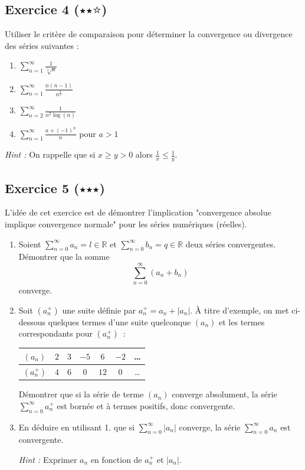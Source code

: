 \documentclass{article}
\begin{document}
\subsection*{Exercice 4 ($\medblackstar \medblackstar \medwhitestar$)}
Utiliser le critère de comparaison pour déterminer la convergence ou divergence des séries suivantes :
\begin{enumerate}
    \item $\displaystyle\sum_{n = 1}^{\infty} \frac{1}{\sqrt[3]{n}}$
    \item $\displaystyle\sum_{n = 1}^{\infty} \frac{n(n-1)}{n^{\frac{8}{3}}}$
    \item $\displaystyle\sum_{n = 2}^{\infty} \frac{1}{n^2 \log(n)}$
    \item $\displaystyle\sum_{n = 1}^{\infty} \frac{a + (-1)^n}{n}$ pour $a > 1$
\end{enumerate}

\textit{Hint :} On rappelle que si $x \geq y > 0$ alors $\frac{1}{x} \leq \frac{1}{y}$.

\subsection*{Exercice 5 ($\medblackstar \medblackstar \medblackstar$)}
L'idée de cet exercice est de démontrer l'implication "convergence absolue implique convergence normale" pour les séries numériques (réelles).
\begin{enumerate}
    \item Soient $\displaystyle\sum_{n = 0}^{\infty} a_n = l \in \mathbb{R}$ et $\displaystyle\sum_{n = 0}^{\infty} b_n = q \in \mathbb{R}$ deux séries convergentes. Démontrer que la somme
    \[
    \sum_{n = 0}^{\infty} (a_n + b_n)
    \]
    converge.
    \item Soit $(a_n^+)$ une suite définie par $a_n^+ = a_n + |a_n|$. À titre d'exemple, on met ci-dessous quelques termes d'une suite quelconque $(a_n)$ et les termes correspondants pour $(a_n^+)$~:
    \begin{table}[h]
        \centering
        \begin{tabular}{|c|cccccc|}
        \hline
        $(a_n)$   & $2$ & $3$ & $-5$ & $6$  & $-2$ & \ldots \\
        \hline
        $(a_n^+)$ & $4$ & $6$ & $0$  & $12$ & $0$  & \ldots \\
        \hline
        \end{tabular}
        \label{tab:exo4}
    \end{table}
    
    Démontrer que si la série de terme $(a_n)$ converge absolument, la série $\displaystyle\sum_{n = 0}^{\infty} a_n^+$ est bornée et à termes positifs, donc convergente.
    \item En déduire en utilisant 1. que si $\displaystyle \sum_{n = 0}^{\infty} |a_n|$ converge, la série $\displaystyle \sum_{n = 0}^{\infty} a_n$ est convergente.
    
    \textit{Hint :} Exprimer $a_n$ en fonction de $a_n^+$ et $|a_n|$.
\end{enumerate}
\end{document}
